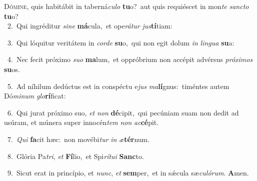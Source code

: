 \lettrine{\initial\textcolor{\initialcolor}{D}}{ómine,} quis habitábit in taberná\-\textit{cu}\-\textit{lo} \textbf{tu}\-o?~\star aut quis requiéscet in mon\textit{te} \textit{sanc}\-\textit{to} \textbf{tu}\-o?\\
{\numbfont\textcolor{\numbcolor}{~2.}}~Qui ingréditur \textit{si}\-\textit{ne} \textbf{má}\-cula,~\star et ope\-\textit{rá}\-\textit{tur} \textit{jus}\-\textbf{tí}tiam:\par
{\numbfont\textcolor{\numbcolor}{~3.}}~Qui lóquitur veritátem in \textit{cor}\-\textit{de} \textbf{su}\-o,~\star qui non egit dolum \textit{in} \textit{lin}\-\textit{gua} \textbf{su}\-a:\par
{\numbfont\textcolor{\numbcolor}{~4.}}~Nec fecit próximo \textit{su}\-\textit{o} \textbf{ma}\-lum,~\star et oppróbrium non accépit advérsus \textit{pró}\-\textit{xi}\textit{mos} \textbf{su}\-os.\par
{\numbfont\textcolor{\numbcolor}{~5.}}~Ad níhilum dedúctus est in conspéctu e\textit{jus} \textit{ma}\-\textbf{lí}gnus:~\star timéntes autem Dó\-\textit{mi}\-\textit{num} \textit{glo}\-\textbf{rí}ficat:\par
{\numbfont\textcolor{\numbcolor}{~6.}}~Qui jurat próximo suo, \textit{et} \textit{non} \textbf{dé}\-cipit,~\star qui pecúniam suam non dedit ad usúram, et múnera super innocén\textit{tem} \textit{non} \textit{ac}\-\textbf{cé}pit.\par
{\numbfont\textcolor{\numbcolor}{~7.}}~\textit{Qui} \textbf{fa}\-cit hæc:~\star non movébi\textit{tur} \textit{in} \textit{æ}\-\textbf{tér}num.\par
{\numbfont\textcolor{\numbcolor}{~8.}}~Glória Pa\-\textit{tri}\-, \textit{et} \textbf{Fí}\-lio,~\star et Spi\-\textit{rí}\-\textit{tu}\textit{i} \textbf{Sanc}\-to.\par
{\numbfont\textcolor{\numbcolor}{~9.}}~Sicut erat in princípio, et \textit{nunc}\-, \textit{et} \textbf{sem}\-per,~\star et in sǽcula sæ\-\textit{cu}\-\textit{ló}\textit{rum}. \textbf{A}\-men.\par
